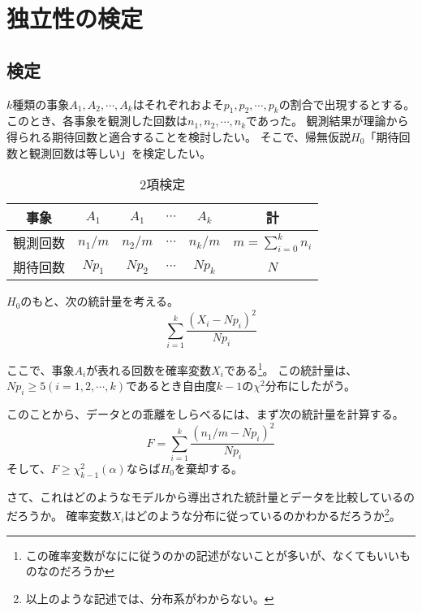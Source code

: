 \section{独立性の検定}

\subsection{検定}
$k$種類の事象$A_1,A_2,\cdots,A_k$はそれぞれおよそ$p_1,p_2,\cdots,p_k$の割合で出現するとする。このとき、各事象を観測した回数は$n_1,n_2,\cdots,n_k$であった。
観測結果が理論から得られる期待回数と適合することを検討したい。
そこで、帰無仮説$H_0$「期待回数と観測回数は等しい」を検定したい。

\fi

\begin{table}[hbtp]
 \caption{2項検定}
 \label{table:binomial_test}
 \centering
 \begin{tabular}{c|cccc|c}
  事象 & $A_1$ & $A_1$ & $\cdots$ & $A_k$ & 計 \\    \hline \hline
  観測回数 & $n_1/m$ & $n_2/m$ & $\cdots$ & $n_k/m$ &  $m=\sum_{i=0}^{k} n_i $ \\
  期待回数 & $N p_1$ & $N p_2$ & $\cdots$ & $N p_k$ &  $N$ 
 \end{tabular}
\end{table}


$H_0$のもと、次の統計量を考える。
\begin{equation*}
 \sum_{i=1}^{k} \frac{(X_i - N p_i)^2}{N p_i}
\end{equation*}


ここで、事象$A_i$が表れる回数を確率変数$X_i$である\footnote{この確率変数がなにに従うのかの記述がないことが多いが、なくてもいいものなのだろうか}。
この統計量は、$N p_i \geq 5 (i=1,2,\cdots, k)$であるとき自由度$k-1$の$\chi^2$分布にしたがう。

このことから、データとの乖離をしらべるには、まず次の統計量を計算する。
\begin{equation*}
 F=\sum_{i=1}^{k} \frac{(n_1/m- N p_i)^2}{N p_i}
\end{equation*}
そして、$F \geq \chi^2_{k-1}(\alpha)$ならば$H_0$を棄却する。


さて、これはどのようなモデルから導出された統計量とデータを比較しているのだろうか。
確率変数$X_i$はどのような分布に従っているのかわかるだろうか\footnote{以上のような記述では、分布系がわからない。}。


